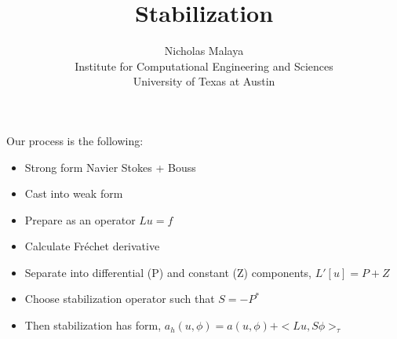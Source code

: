 \documentclass{article}
\title{\bf{Stabilization}}
\author{Nicholas Malaya \\ Institute for Computational Engineering and Sciences \\ University of Texas at Austin} \date{}
\begin{document}
\maketitle

Our process is the following: 
\begin{itemize}
 \item Strong form Navier Stokes + Bouss
 \item Cast into weak form
 \item Prepare as an operator $Lu=f$
 \item Calculate Fr\'echet derivative
 \item Separate into differential (P) and constant (Z) components,
       $L'[u] = P + Z$
 \item Choose stabilization operator such that $S = -P^*$
 \item Then stabilization has form, $a_h(u,\phi) = a(u,\phi) + <Lu,S\phi>_\tau$
\end{itemize}
\end{document}
